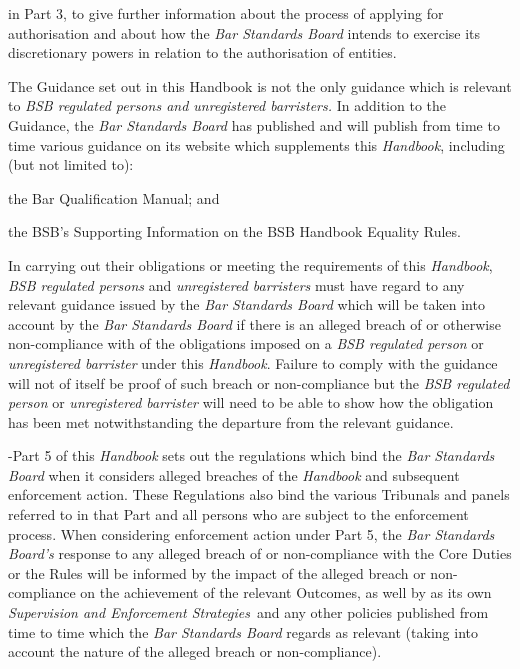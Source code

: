 \begin{numlist}
\begin{alphlist}
\begin{romlist}
\item in Part 3, to give further information about the process of applying
for authorisation and about how the \emph{Bar Standards Board} intends
to exercise its discretionary powers in relation to the authorisation of
entities.
\end{romlist}
\item The Guidance set out in this Handbook is not the only guidance which
is relevant to \emph{BSB \emph{regulated persons and unregistered
barristers}.} In addition to the Guidance, the \emph{Bar Standards
Board} has published and will publish from time to time various guidance
on its website which supplements this \emph{Handbook}, including (but
not limited to):
\begin{romlist}
\item the Bar Qualification Manual; and

\item the BSB's Supporting Information on the BSB Handbook Equality Rules.
\end{romlist}
\item In carrying out their obligations or meeting the requirements of this
\emph{Handbook}, \emph{BSB regulated persons} and \emph{unregistered
barristers} must have regard to any relevant guidance issued by the
\emph{Bar Standards Board} which will be taken into account by the
\emph{Bar Standards Board} if there is an alleged breach of or otherwise
non-compliance with of the obligations imposed on a \emph{BSB regulated
person} or \emph{unregistered barrister} under this \emph{Handbook}.
Failure to comply with the guidance will not of itself be proof of such
breach or non-compliance but the \emph{BSB regulated person} or
\emph{unregistered barrister} will need to be able to show how the
obligation has been met notwithstanding the departure from the relevant
guidance.\end{alphlist}
\item {}-Part 5 of this \emph{Handbook} sets out the
regulations which bind the \emph{Bar Standards \emph{Board}} when it
considers alleged breaches of the \emph{Handbook} and subsequent
enforcement action. These Regulations also bind the various Tribunals
and panels referred to in that Part and all persons who are subject to
the enforcement process. When considering enforcement action under Part
5, the \emph{Bar Standards Board's} response to any alleged breach of or
non-compliance with the Core Duties or the Rules will be informed by the
impact of the alleged breach or non-compliance on the achievement of the
relevant Outcomes, as well by as its own \emph{Supervision and
Enforcement Strategies}~and any other policies published from time to
time which the \emph{Bar Standards Board} regards as relevant (taking
into account the nature of the alleged breach or non-compliance).
\end{numlist}


